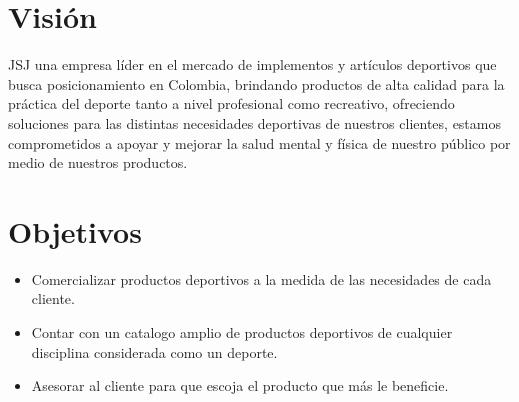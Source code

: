 \section{Visión}

 JSJ una empresa líder en el mercado de implementos y artículos deportivos que busca posicionamiento en Colombia, brindando productos de alta calidad para la práctica del deporte tanto a nivel profesional como recreativo, ofreciendo soluciones para las distintas necesidades deportivas de nuestros clientes,  estamos comprometidos a apoyar y mejorar la salud mental y física de nuestro público por medio de nuestros productos.

\section{Objetivos}

\begin{itemize}
	\item Comercializar productos deportivos a la medida  de las necesidades de cada cliente.
	\item Contar con un catalogo amplio de productos deportivos de cualquier disciplina considerada como un deporte.
	\item Asesorar al cliente para que escoja el producto que más le beneficie.
\end{itemize}



